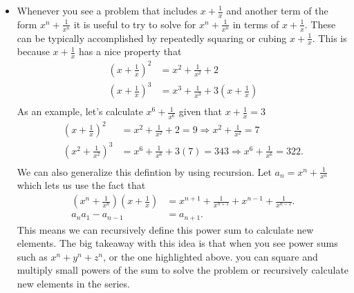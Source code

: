 \documentclass[11pt]{article}
\begin{document}
\begin{itemize}
\item Whenever you see a problem that includes $x+\frac{1}{x}$ and another term of the form $x^n+\frac{1}{x^n}$ it is useful to try to solve for $x^n+\frac{1}{x^n}$ in terms of $x+\frac{1}{x}$. These can be typically accomplished by repeatedly squaring or cubing $x+\frac{1}{x}$.
    This is because $x+\frac{1}{x}$ has a nice property that
    \begin{equation*}
        \begin{aligned}
            (x+\frac{1}{x})^2 & = x^2 +\frac{1}{x^2} + 2 \\
            (x+\frac{1}{x})^3 & = x^3 + \frac{1}{x^3} + 3(x+\frac{1}{x}) \\
        \end{aligned}
    \end{equation*}
    As an example, let's calculate $x^6+\frac{1}{x^6}$ given that $x+\frac{1}{x}=3$
    \begin{equation*}
        \begin{aligned}
            (x+\frac{1}{x})^2  & = x^2+\frac{1}{x^2} + 2 = 9 \Longrightarrow x^2 + \frac{1}{x^2} = 7 \\
            (x^2+\frac{1}{x^2})^3 & = x^6+\frac{1}{x^6} + 3(7) =  343 \Longrightarrow x^6 + \frac{1}{x^6} = 322. \\
        \end{aligned}
    \end{equation*}
    We can also generalize this defintion by using recursion. Let $a_n = x^n+\frac{1}{x^n}$ which lets us use the fact that
    \begin{equation*}
        \begin{aligned}
            (x^n+\frac{1}{x^n})(x+\frac{1}{x})  & = x^{n+1}+\frac{1}{x^{n+1}} + x^{n-1}+\frac{1}{x^{n-1}}. \\
            a_n a_1 - a_{n-1}  & = a_{n+1}.
        \end{aligned}
    \end{equation*}
    This means we can recursively define this power sum to calculate new elements. The big takeaway with this idea is that when you see power sums such as $x^n+y^n+z^n$, or the one highlighted above.
    you can square and multiply small powers of the sum to solve the problem or recursively calculate new elements in the series.


\end{itemize}
\end{document}
